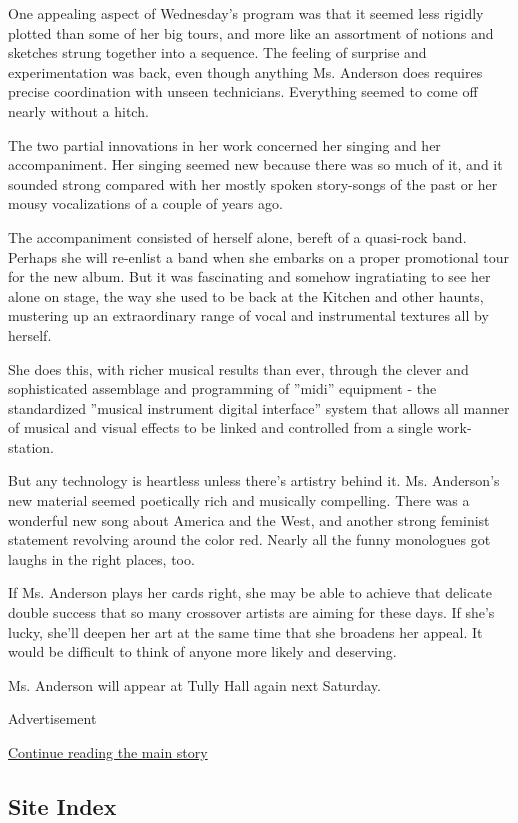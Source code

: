 One appealing aspect of Wednesday's program was that it seemed less
rigidly plotted than some of her big tours, and more like an assortment
of notions and sketches strung together into a sequence. The feeling of
surprise and experimentation was back, even though anything Ms. Anderson
does requires precise coordination with unseen technicians. Everything
seemed to come off nearly without a hitch.

The two partial innovations in her work concerned her singing and her
accompaniment. Her singing seemed new because there was so much of it,
and it sounded strong compared with her mostly spoken story-songs of the
past or her mousy vocalizations of a couple of years ago.

The accompaniment consisted of herself alone, bereft of a quasi-rock
band. Perhaps she will re-enlist a band when she embarks on a proper
promotional tour for the new album. But it was fascinating and somehow
ingratiating to see her alone on stage, the way she used to be back at
the Kitchen and other haunts, mustering up an extraordinary range of
vocal and instrumental textures all by herself.

She does this, with richer musical results than ever, through the clever
and sophisticated assemblage and programming of ''midi'' equipment - the
standardized ''musical instrument digital interface'' system that allows
all manner of musical and visual effects to be linked and controlled
from a single work-station.

But any technology is heartless unless there's artistry behind it. Ms.
Anderson's new material seemed poetically rich and musically compelling.
There was a wonderful new song about America and the West, and another
strong feminist statement revolving around the color red. Nearly all the
funny monologues got laughs in the right places, too.

If Ms. Anderson plays her cards right, she may be able to achieve that
delicate double success that so many crossover artists are aiming for
these days. If she's lucky, she'll deepen her art at the same time that
she broadens her appeal. It would be difficult to think of anyone more
likely and deserving.

Ms. Anderson will appear at Tully Hall again next Saturday.

Advertisement

\protect\hyperlink{after-bottom}{Continue reading the main story}

\hypertarget{site-index}{%
\subsection{Site Index}\label{site-index}}

